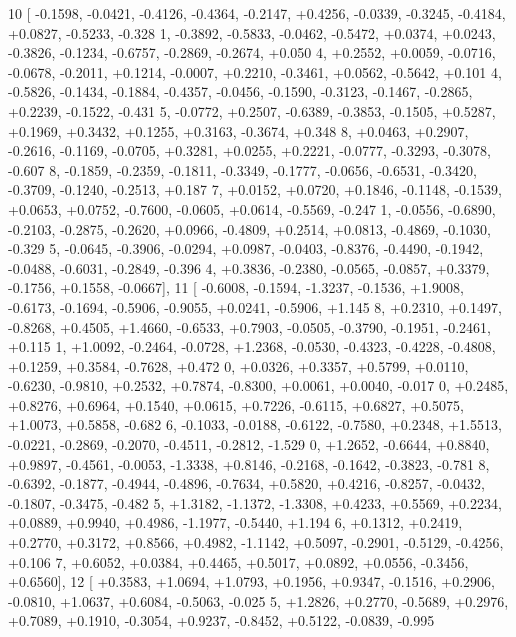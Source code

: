 \begin{DoxyCode}
10 [ -0.1598, -0.0421, -0.4126, -0.4364, -0.2147, +0.4256, -0.0339, -0.3245, -0.4184, +0.0827, -0.5233, -0.328
      1, -0.3892, -0.5833, -0.0462, -0.5472, +0.0374, +0.0243, -0.3826, -0.1234, -0.6757, -0.2869, -0.2674, +0.050
      4, +0.2552, +0.0059, -0.0716, -0.0678, -0.2011, +0.1214, -0.0007, +0.2210, -0.3461, +0.0562, -0.5642, +0.101
      4, -0.5826, -0.1434, -0.1884, -0.4357, -0.0456, -0.1590, -0.3123, -0.1467, -0.2865, +0.2239, -0.1522, -0.431
      5, -0.0772, +0.2507, -0.6389, -0.3853, -0.1505, +0.5287, +0.1969, +0.3432, +0.1255, +0.3163, -0.3674, +0.348
      8, +0.0463, +0.2907, -0.2616, -0.1169, -0.0705, +0.3281, +0.0255, +0.2221, -0.0777, -0.3293, -0.3078, -0.607
      8, -0.1859, -0.2359, -0.1811, -0.3349, -0.1777, -0.0656, -0.6531, -0.3420, -0.3709, -0.1240, -0.2513, +0.187
      7, +0.0152, +0.0720, +0.1846, -0.1148, -0.1539, +0.0653, +0.0752, -0.7600, -0.0605, +0.0614, -0.5569, -0.247
      1, -0.0556, -0.6890, -0.2103, -0.2875, -0.2620, +0.0966, -0.4809, +0.2514, +0.0813, -0.4869, -0.1030, -0.329
      5, -0.0645, -0.3906, -0.0294, +0.0987, -0.0403, -0.8376, -0.4490, -0.1942, -0.0488, -0.6031, -0.2849, -0.396
      4, +0.3836, -0.2380, -0.0565, -0.0857, +0.3379, -0.1756, +0.1558, -0.0667],
11 [ -0.6008, -0.1594, -1.3237, -0.1536, +1.9008, -0.6173, -0.1694, -0.5906, -0.9055, +0.0241, -0.5906, +1.145
      8, +0.2310, +0.1497, -0.8268, +0.4505, +1.4660, -0.6533, +0.7903, -0.0505, -0.3790, -0.1951, -0.2461, +0.115
      1, +1.0092, -0.2464, -0.0728, +1.2368, -0.0530, -0.4323, -0.4228, -0.4808, +0.1259, +0.3584, -0.7628, +0.472
      0, +0.0326, +0.3357, +0.5799, +0.0110, -0.6230, -0.9810, +0.2532, +0.7874, -0.8300, +0.0061, +0.0040, -0.017
      0, +0.2485, +0.8276, +0.6964, +0.1540, +0.0615, +0.7226, -0.6115, +0.6827, +0.5075, +1.0073, +0.5858, -0.682
      6, -0.1033, -0.0188, -0.6122, -0.7580, +0.2348, +1.5513, -0.0221, -0.2869, -0.2070, -0.4511, -0.2812, -1.529
      0, +1.2652, -0.6644, +0.8840, +0.9897, -0.4561, -0.0053, -1.3338, +0.8146, -0.2168, -0.1642, -0.3823, -0.781
      8, -0.6392, -0.1877, -0.4944, -0.4896, -0.7634, +0.5820, +0.4216, -0.8257, -0.0432, -0.1807, -0.3475, -0.482
      5, +1.3182, -1.1372, -1.3308, +0.4233, +0.5569, +0.2234, +0.0889, +0.9940, +0.4986, -1.1977, -0.5440, +1.194
      6, +0.1312, +0.2419, +0.2770, +0.3172, +0.8566, +0.4982, -1.1142, +0.5097, -0.2901, -0.5129, -0.4256, +0.106
      7, +0.6052, +0.0384, +0.4465, +0.5017, +0.0892, +0.0556, -0.3456, +0.6560],
12 [ +0.3583, +1.0694, +1.0793, +0.1956, +0.9347, -0.1516, +0.2906, -0.0810, +1.0637, +0.6084, -0.5063, -0.025
      5, +1.2826, +0.2770, -0.5689, +0.2976, +0.7089, +0.1910, -0.3054, +0.9237, -0.8452, +0.5122, -0.0839, -0.995

\end{DoxyCode}
